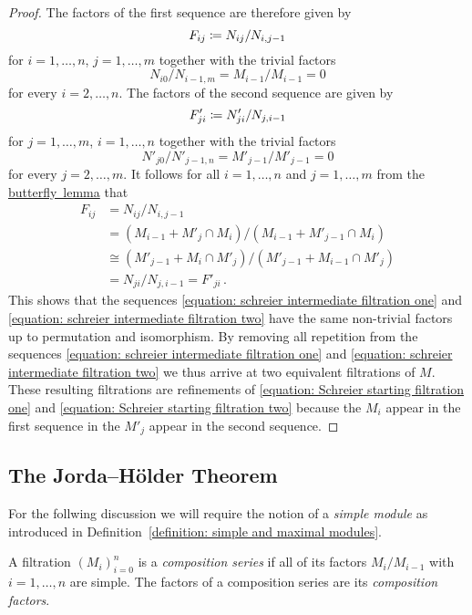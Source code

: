 \begin{proof}
  The factors of the first sequence are therefore given by
  \[
              F_{ij}
    \coloneqq  N_{ij}/N_{i,j-1}
  \]
  for $i = 1, \dotsc, n$, $j = 1, \dotsc, m$ together with the trivial factors
  \[
      N_{i0}/N_{i-1,m}
    = M_{i-1}/M_{i-1}
    = 0
  \]
  for every $i = 2, \dotsc, n$.
  The factors of the second sequence are given by
  \[
              F'_{ji}
    \coloneqq  N'_{ji}/N_{j,i-1}
  \]
  for $j = 1, \dotsc, m$, $i = 1, \dotsc, n$ together with the trivial factors
  \[
      N'_{j0}/N'_{j-1,n}
    = M'_{j-1}/M'_{j-1}
    = 0
  \]
  for every $j = 2, \dotsc, m$.
  It follows for all $i = 1, \dotsc, n$ and $j = 1, \dotsc, m$ from the \hyperref[lemma: butterfly lemma]{butterfly~lemma} that
  \begin{align*}
            F_{ij}
    &=      N_{ij}/N_{i,j-1}  \\
    &=      (M_{i-1} + M'_j \cap M_i)/(M_{i-1} + M'_{j-1} \cap M_i)   \\
    &\cong  (M'_{j-1} + M_i \cap M'_j)/(M'_{j-1} + M_{i-1} \cap M'_j) \\
    &=      N_{ji}/N_{j,i-1}
     =      F'_{ji} \,.
  \end{align*}
  This shows that the sequences \eqref{equation: schreier intermediate filtration one} and \eqref{equation: schreier intermediate filtration two} have the same non-trivial factors up to permutation and isomorphism.
  By removing all repetition from the sequences \eqref{equation: schreier intermediate filtration one} and \eqref{equation: schreier intermediate filtration two} we thus arrive at two equivalent filtrations of $M$.
  These resulting filtrations are refinements of \eqref{equation: Schreier starting filtration one} and \eqref{equation: Schreier starting filtration two} because the $M_i$ appear in the first sequence in the $M'_j$ appear in the second sequence.
\end{proof}





\subsection{The Jorda--Hölder Theorem}


\begin{fluff}
  For the follwing discussion we will require the notion of a \emph{simple module} as introduced in Definition~\ref{definition: simple and maximal modules}.
\end{fluff}


\begin{definition}
  \label{definition: composition series}
  A filtration $(M_i)_{i=0}^n$ is a \emph{composition series} if all of its factors $M_i/M_{i-1}$ with $i = 1, \dotsc, n$ are simple.
  The factors of a composition series are its \emph{composition factors}.
\end{definition}


